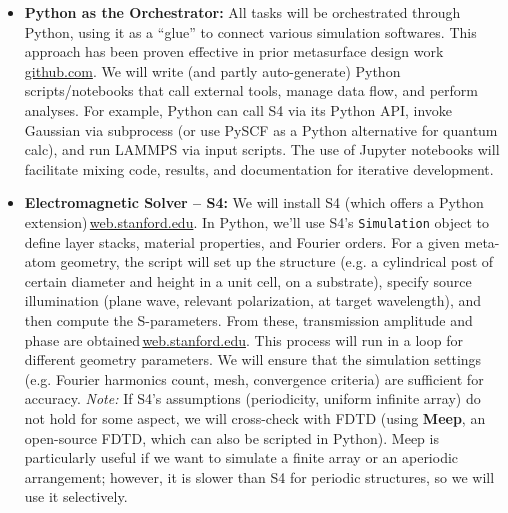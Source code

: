 \documentclass[11pt]{article}
\begin{document}
\begin{itemize}
  \item \textbf{Python as the Orchestrator:} All tasks will be orchestrated through Python, using it as a ``glue'' to connect various simulation softwares. This approach has been proven effective in prior metasurface design work\,\href{https://github.com/hzzg0727/Metasurface-Design#:~:text=A%20major%20advantage%20of%20the,flexible%2C%20convenient%2C%20and%20automated%20workflow}{github.com}. We will write (and partly auto-generate) Python scripts/notebooks that call external tools, manage data flow, and perform analyses. For example, Python can call S4 via its Python API, invoke Gaussian via subprocess (or use PySCF as a Python alternative for quantum calc), and run LAMMPS via input scripts. The use of Jupyter notebooks will facilitate mixing code, results, and documentation for iterative development.
  \item \textbf{Electromagnetic Solver -- S4:} We will install S4 (which offers a Python extension)\,\href{https://web.stanford.edu/group/fan/S4/#:~:text=also%20called%20the%20Fourier%20Modal,the%20Stanford%20Electrical%20Engineering%20Department}{web.stanford.edu}. In Python, we'll use S4's \texttt{Simulation} object to define layer stacks, material properties, and Fourier orders. For a given meta-atom geometry, the script will set up the structure (e.g. a cylindrical post of certain diameter and height in a unit cell, on a substrate), specify source illumination (plane wave, relevant polarization, at target wavelength), and then compute the S-parameters. From these, transmission amplitude and phase are obtained\,\href{https://web.stanford.edu/group/fan/S4/#:~:text=What%20can%20it%20compute%3F%E2%80%B6}{web.stanford.edu}. This process will run in a loop for different geometry parameters. We will ensure that the simulation settings (e.g. Fourier harmonics count, mesh, convergence criteria) are sufficient for accuracy. \emph{Note:} If S4's assumptions (periodicity, uniform infinite array) do not hold for some aspect, we will cross-check with FDTD (using \textbf{Meep}, an open-source FDTD, which can also be scripted in Python). Meep is particularly useful if we want to simulate a finite array or an aperiodic arrangement; however, it is slower than S4 for periodic structures, so we will use it selectively.

\end{itemize}
\end{document}
